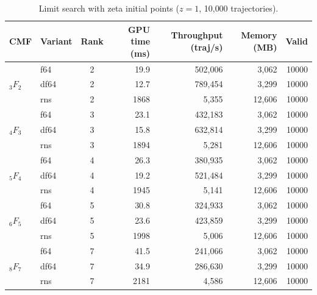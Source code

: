 \documentclass[11pt,a4paper]{article}
\begin{document}
\begin{table}[h]
\centering
\caption{Limit search with zeta initial points ($z=1$, 10{,}000 trajectories).}
\label{tab:zeta-limit}
\small
\begin{tabular}{llcrrrr}
\toprule
CMF & Variant & Rank & GPU time (ms) & Throughput (traj/s) & Memory (MB) & Valid \\
\midrule
\multirow{3}{*}{${}_3F_2$} & f64  & 2 & 19.9 & 502{,}006 & 3{,}062 & 10000 \\
                           & df64 & 2 & 12.7 & 789{,}454 & 3{,}299 & 10000 \\
                           & rns  & 2 & 1868 & 5{,}355   & 12{,}606 & 10000 \\
\midrule
\multirow{3}{*}{${}_4F_3$} & f64  & 3 & 23.1 & 432{,}183 & 3{,}062 & 10000 \\
                           & df64 & 3 & 15.8 & 632{,}814 & 3{,}299 & 10000 \\
                           & rns  & 3 & 1894 & 5{,}281   & 12{,}606 & 10000 \\
\midrule
\multirow{3}{*}{${}_5F_4$} & f64  & 4 & 26.3 & 380{,}935 & 3{,}062 & 10000 \\
                           & df64 & 4 & 19.2 & 521{,}484 & 3{,}299 & 10000 \\
                           & rns  & 4 & 1945 & 5{,}141   & 12{,}606 & 10000 \\
\midrule
\multirow{3}{*}{${}_6F_5$} & f64  & 5 & 30.8 & 324{,}933 & 3{,}062 & 10000 \\
                           & df64 & 5 & 23.6 & 423{,}859 & 3{,}299 & 10000 \\
                           & rns  & 5 & 1998 & 5{,}006   & 12{,}606 & 10000 \\
\midrule
\multirow{3}{*}{${}_8F_7$} & f64  & 7 & 41.5 & 241{,}066 & 3{,}062 & 10000 \\
                           & df64 & 7 & 34.9 & 286{,}630 & 3{,}299 & 10000 \\
                           & rns  & 7 & 2181 & 4{,}586   & 12{,}606 & 10000 \\
\bottomrule
\end{tabular}
\end{table}
\end{document}
